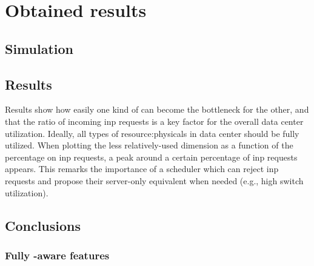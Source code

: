 \section{Obtained results}

\subsection{Simulation}



\subsection{Results}
Results show how easily one kind of  can become the bottleneck for the other, and that the ratio of incoming \gls{inp} requests is a key factor for the overall data center utilization.
Ideally, all types of \glspl{resource:physical} in data center should be fully utilized.
When plotting the less relatively-used  dimension as a function of the percentage on \gls{inp} requests, a peak around a certain percentage of \gls{inp} requests appears.
This remarks the importance of a scheduler which can reject \gls{inp} requests and propose their server-only equivalent when needed (e.g., high switch utilization).

\subsection{Conclusions}


\subsubsection{Fully \texorpdfstring{}{INP}-aware \texorpdfstring{}{RM} features}


% 


{\footnotesize}

